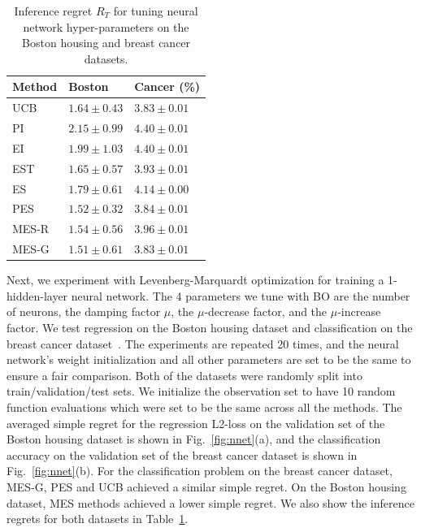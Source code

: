 \begin{table}[t]
\caption{Inference regret $R_T$ for tuning neural network hyper-parameters on the Boston housing and breast cancer datasets.}
\label{tb:nnet}
\vskip -0.5in
\begin{center}
\begin{small}
\begin{sc}
\begin{tabular}{lll}%
\hline
\abovespace\belowspace
Method & Boston & Cancer (\%) \\
\hline
\abovespace
UCB & $1.64 \pm 0.43$ & {\color{red}$3.83 \pm 0.01$}  \\
PI & $2.15 \pm 0.99$ & $4.40 \pm 0.01$  \\
EI & $1.99 \pm 1.03$ & $4.40 \pm 0.01$  \\
EST & $1.65 \pm 0.57$ & $3.93 \pm 0.01$  \\
ES & $1.79 \pm 0.61$ & $4.14 \pm 0.00$  \\
PES &  {\color{red}$1.52 \pm 0.32$} &  {\color{red}$3.84 \pm 0.01$}  \\
MES-R & $1.54 \pm 0.56$ & $3.96 \pm 0.01$  \\
\belowspace
MES-G & {\color{red}$1.51 \pm 0.61$} & {\color{red}$3.83 \pm 0.01$}  \\
\hline
\end{tabular}
\end{sc}
\end{small}
\end{center}
\vskip -0.2in
\end{table}

Next, we experiment with Levenberg-Marquardt optimization for training a 1-hidden-layer neural network. The 4 parameters we tune with BO are the number of neurons,  the damping factor $\mu$, the $\mu$-decrease factor, and  the $\mu$-increase factor. We test regression on the Boston housing dataset and classification on the breast cancer dataset~\cite{bache2013uci}. The experiments are repeated 20 times, and the neural network's weight initialization and all other parameters are set to be the same to ensure a fair comparison. Both of the datasets were randomly split into train/validation/test sets. We initialize the observation set to have 10 random function evaluations which were set to be the same across all the methods. The averaged simple regret for the regression L2-loss on the validation set of the Boston housing dataset is shown in Fig.~\ref{fig:nnet}(a), and the classification accuracy on the validation set of the breast cancer dataset is shown in Fig.~\ref{fig:nnet}(b).   For the classification problem on the breast cancer dataset, MES-G, PES and UCB achieved a similar simple regret. On the Boston housing dataset, MES methods achieved a lower simple regret. We also show the inference regrets for both datasets in Table~\ref{tb:nnet}. 


